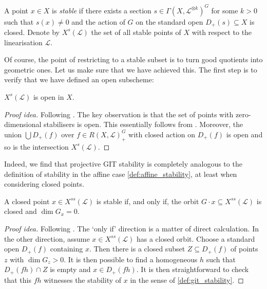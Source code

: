 \documentclass[12pt]{ociamthesis}  %
\begin{document}
\begin{definition}\label{def:git_stability}
  A point $x\in X$ is \emph{stable} if there exists a section
  $s\in\Gamma(X,\mathscr L^{\otimes k})^G$ for some $k>0$ such that $s(x)\neq 0$
  and the action of $G$ on the standard open $D_+(s)\subseteq X$ is closed.
  Denote by $X^s(\mathscr L)$ the set of all stable points of $X$ with respect
  to the linearisation $\mathscr L$.
\end{definition}

Of course, the point of restricting to a stable subset is to turn
good quotients into geometric ones. Let us make sure that we have
achieved this. The first step is to verify that we have defined
an open subscheme:

\begin{lemma}
  $X^s(\mathscr L)$ is open in $X$.
  \begin{proof}[Proof idea]
    Following \cite[Lemma 5.5]{hoskins2016}.  The key observation is that the
    set of points with zero-dimensional stabilisers is open. This essentially
    follows from \cite[]{hartshorne1977}.  Moreover, the union $\bigcup
    D_+(f)$ over $f\in R(X,\mathscr L)_+^G$ with closed action on $D_+(f)$ is
    open and so is the intersection $X^s(\mathscr L)$.
  \end{proof}
\end{lemma}

Indeed, we find that projective GIT stability is completely analogous to the definition
of stability in the affine case \ref{def:affine_stability}, at least when
considering closed points.

\begin{lemma}
  A closed point $x\in X^{ss}(\mathscr L)$ is stable if, and only if, the orbit
  $G\cdot x\subseteq X^{ss}(\mathscr L)$ is closed and $\dim G_x = 0$.
  \begin{proof}[Proof idea]
    Following \cite[Lemma 5.9]{hoskins2016}.
    The `only if' direction is a matter of direct calculation.
    In the other direction, assume $x\in X^{ss}(\mathscr L)$ has a
    closed orbit. Choose a standard open $D_+(f)$ containing
    $x$. Then there is a closed subset $Z\subseteq D_+(f)$ of
    points $z$ with $\dim G_z > 0$. It is then possible to find
    a homogeneous $h$ such that $D_+(fh)\cap Z$ is empty and
    $x\in D_+(fh)$. It is then straightforward to check that this
    $fh$ witnesses the stability of $x$ in the sense of
    \ref{def:git_stability}.
  \end{proof}
\end{lemma}
\end{document}

